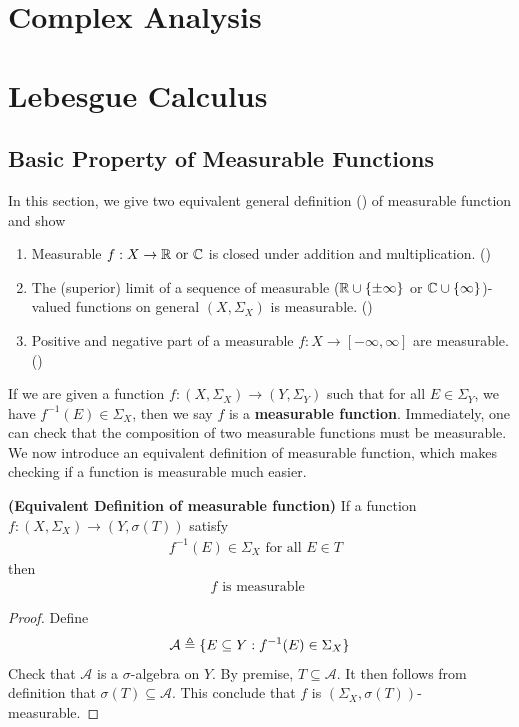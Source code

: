 \documentclass{report}
\begin{document}
\chapter{Complex Analysis}
\chapter{Lebesgue Calculus}
\section{Basic Property of Measurable Functions}
\begin{mdframed}
In this section, we give two equivalent general definition () of measurable function and show
\begin{enumerate}[label=(\alph*)]
  \item Measurable $f:X\rightarrow \mathbb{R}\text{ or }\mathbb{C}$  is closed under addition and multiplication. ()
  \item The (superior) limit of a sequence of measurable ($\mathbb{R}\cup \{ \pm \infty \} $ or $\mathbb{C}\cup \{ \infty \}$)-valued functions on general $(X,\Sigma_X)$ is measurable. ()
  \item Positive and negative part of a measurable $f:X\rightarrow [-\infty,\infty]$ are measurable. ()
\end{enumerate}
\end{mdframed}
\begin{mdframed}
If we are given a function $f:(X,\Sigma_X)\rightarrow (Y,\Sigma_Y)$ such that for all $E\in \Sigma_Y$, we have $f^{-1}(E) \in \Sigma_X$, then we say $f$ is a  \textbf{measurable function}. Immediately, one can check that the composition of two measurable functions must be measurable. We now introduce an equivalent definition of measurable function, which makes checking if a function is measurable much easier.
\end{mdframed}
\begin{theorem}
\label{EDm}
\textbf{(Equivalent Definition of measurable function)} If a function $f:(X,\Sigma_X)\rightarrow (Y,\sigma (T))$ satisfy 
\begin{align*}
f^{-1}(E)\in \Sigma_X\text{ for all $E \in T$ }
\end{align*}
then 
\begin{align*}
f\text{ is measurable }
\end{align*}
\end{theorem}
\begin{proof}
Define 
\begin{align*}
\mathcal{A}\triangleq \{ E \subseteq Y: f^{-1}(E)\in \Sigma_X \}
\end{align*}
Check that $\mathcal{A}$ is a $\sigma$-algebra on $Y$. By premise, $T \subseteq \mathcal{A}$. It then follows from definition that $\sigma (T)\subseteq \mathcal{A}$. This conclude that $f$ is  $(\Sigma_X, \sigma(T))$-measurable. 
\end{proof}
\end{document}
